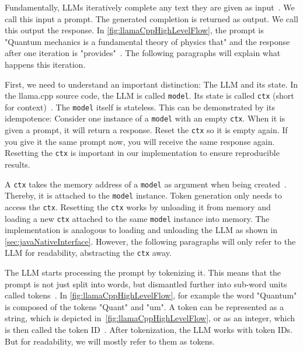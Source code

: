 Fundamentally, \glspl{LLM} iteratively complete any text they are given as input~\cite{mallisUnderstandingHowLLM2023}. We call this input a prompt. The generated completion is returned as output. We call this output the response. In \cref{fig:llamaCppHighLevelFlow}, the prompt is "Quantum mechanics is a fundamental theory of physics that" and the response after one iteration is "provides"~\cite{mallisUnderstandingHowLLM2023}. The following paragraphs will explain what happens this iteration.

First, we need to understand an important distinction: The \gls{LLM} and its state. In the llama.cpp source code, the \gls{LLM} is called \lstinline|model|. Its state is called \lstinline|ctx| (short for context)~\cite{gerganovGgerganovLlamacpp2024}. The \lstinline|model| itself is stateless. This can be demonstrated by its idempotence: Consider one instance of a \lstinline|model| with an empty \lstinline|ctx|. When it is given a prompt, it will return a response. Reset the \lstinline|ctx| so it is empty again. If you give it the same prompt now, you will receive the same response again. Resetting the \lstinline|ctx| is important in our implementation to ensure reproducible results.

A \lstinline|ctx| takes the memory address of a \lstinline|model| as argument when being created~\cite{gerganovGgerganovLlamacpp2024}. Thereby, it is attached to the \lstinline|model| instance. Token generation only needs to access the \lstinline|ctx|. Resetting the \lstinline|ctx| works by unloading it from memory and loading a new \lstinline|ctx| attached to the same \lstinline|model| instance into memory. The implementation is analogous to loading and unloading the \gls{LLM} as shown in \cref{sec:javaNativeInterface}. However, the following paragraphs will only refer to the \gls{LLM} for readability, abstracting the \lstinline|ctx| away.

The \gls{LLM} starts processing the prompt by tokenizing it. This means that the prompt is not just split into words, but dismantled further into sub-word units called tokens~\cite{mallisUnderstandingHowLLM2023}. In \cref{fig:llamaCppHighLevelFlow}, for example the word "Quantum" is composed of the tokens "Quant" and "um". A token can be represented as a string, which is depicted in~\cref{fig:llamaCppHighLevelFlow}, or as an integer, which is then called the token ID~\cite{mallisUnderstandingHowLLM2023}. After tokenization, the \gls{LLM} works with token IDs. But for readability, we will mostly refer to them as tokens.

